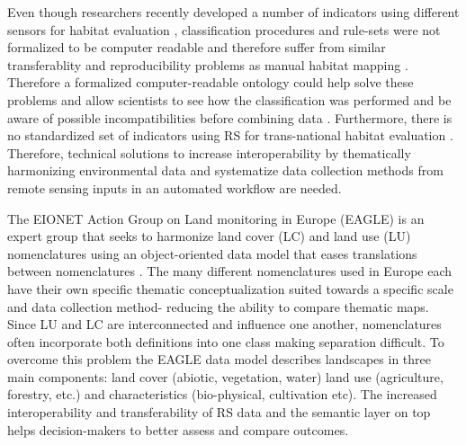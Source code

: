 \documentclass[authoryear, review,12pt,number]{elsarticle}
\begin{document}
Even though researchers recently developed a number of indicators using
different sensors for habitat evaluation \citep{Nagendra2013}, classification
procedures and rule-sets were not formalized to be computer readable and
therefore suffer from similar transferablity and reproducibility problems as
manual habitat mapping \citep{Arvor2013, Nieland2015}. Therefore a formalized
computer-readable ontology could help solve these problems and allow scientists
to see how the classification was performed and be aware of possible
incompatibilities before combining data \citep{Janowicz2012}.  Furthermore,
there is no standardized set of indicators using RS for trans-national habitat
evaluation \citep{Lucas2015, VandenBorre2011}. Therefore, technical solutions to
increase interoperability by thematically harmonizing environmental data and
systematize data collection methods from remote sensing inputs in an automated
workflow are needed. 

The EIONET Action Group on Land monitoring in Europe (EAGLE) is an expert group
that seeks to harmonize land cover (LC) and land use (LU) nomenclatures using an
object-oriented data model that eases translations between nomenclatures
\citep{arnold2013eagle}. The many different nomenclatures used in Europe each
have their own specific thematic conceptualization suited towards a specific
scale and data collection method- reducing the ability to compare thematic maps.
Since LU and LC are interconnected and influence one another, nomenclatures
often incorporate both definitions into one class making separation difficult.
To overcome this problem the EAGLE data model describes landscapes in three main
components: land cover (abiotic, vegetation, water) land use (agriculture,
forestry, etc.) and characteristics (bio-physical, cultivation etc). The
increased interoperability and transferability of RS data and the semantic layer
on top helps decision-makers to better assess and compare outcomes. 
\end{document}
